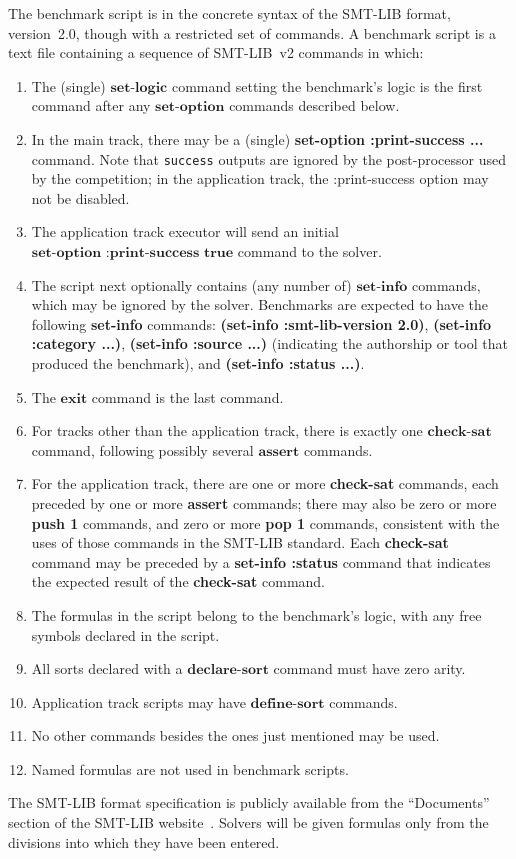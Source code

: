\documentclass[12pt]{article}
\newcommand{\akey}[1]{\textbf{#1}}
\begin{document}
The benchmark script is in the concrete syntax of the SMT-LIB format,
version~2.0, though with a restricted set of commands.  A benchmark
script is a text file containing a sequence of SMT-LIB~v2 commands in
which:
%
\begin{enumerate}
\item The (single) $\akey{set-logic}$ command setting the benchmark's
  logic is the first command after any $\akey{set-option}$ commands
  described below.
\item In the main track, there may be a (single) \akey{set-option
  :print-success ...} command. Note that {\tt success} outputs are
  ignored by the post-processor used by the competition; in the
  application track, the :print-success option may not be disabled.
\item The application track executor will send an initial
  $\akey{set-option :print-success true}$ command to the solver.
\item The script next optionally contains (any number of)
  $\akey{set-info}$ commands, which may be ignored by the
  solver. Benchmarks are expected to have the following
  \akey{set-info} commands: \akey{(set-info :smt-lib-version 2.0)},
  \akey{(set-info :category ...)}, \akey{(set-info :source ...)}
  (indicating the authorship or tool that produced the benchmark), and
  \akey{(set-info :status ...)}.
\item The $\akey{exit}$ command is the last command.
\item For tracks other than the application track, there is exactly
  one $\akey{check-sat}$ command, following possibly several
  $\akey{assert}$ commands.
\item For the application track, there are one or more
  \akey{check-sat} commands, each preceded by one or more
  \akey{assert} commands; there may also be zero or more \akey{push 1}
  commands, and zero or more \akey{pop 1} commands, consistent with
  the uses of those commands in the SMT-LIB standard. Each
  \akey{check-sat} command may be preceded by a \akey{set-info
    :status} command that indicates the expected result of the
  \akey{check-sat} command.
\item The formulas in the script belong to the benchmark's logic, with
  any free symbols declared in the script.
\item All sorts declared with a $\akey{declare-sort}$ command must
  have zero arity.
\item Application track scripts may have $\akey{define-sort}$
  commands.
\item No other commands besides the ones just mentioned may be used.
\item Named formulas are not used in benchmark scripts.
\end{enumerate}
%
The SMT-LIB format specification is publicly available from the
``Documents'' section of the SMT-LIB website~\cite{SMT-LIB}.  Solvers
will be given formulas only from the divisions into which they have
been entered.
\end{document}
